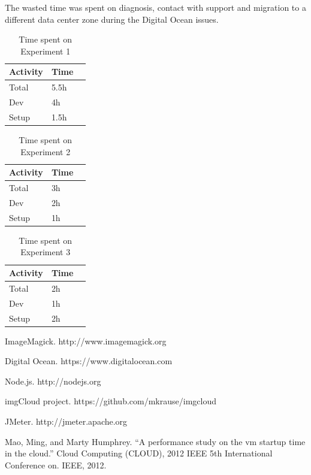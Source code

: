 \documentclass[conference]{IEEEtran}
\begin{document}
The wasted time was spent on diagnosis, contact with support and migration to a different data center zone during the Digital Ocean issues.

\begin{table}[H]
  \centering
  \begin{tabular}{| l | l | l |}
    \hline
    Activity & Time \\ \hline
    Total & 5.5h \\ \hline
    Dev & 4h \\ \hline
    Setup & 1.5h \\ \hline
  \end{tabular}
  \caption{Time spent on Experiment 1}
\end{table}

\begin{table}[H]
  \centering
  \begin{tabular}{| l | l | l |}
    \hline
    Activity & Time \\ \hline
    Total & 3h \\ \hline
    Dev & 2h \\ \hline
    Setup & 1h \\ \hline
  \end{tabular}
  \caption{Time spent on Experiment 2}
\end{table}

\begin{table}[H]
  \centering
  \begin{tabular}{| l | l | l |}
    \hline
    Activity & Time \\ \hline
    Total & 2h \\ \hline
    Dev & 1h \\ \hline
    Setup & 2h \\ \hline
  \end{tabular}
  \caption{Time spent on Experiment 3}
\end{table}

\begin{thebibliography}{6}

ImageMagick. http://www.imagemagick.org

Digital Ocean. https://www.digitalocean.com

Node.js. http://nodejs.org

imgCloud project. https://github.com/mkrause/imgcloud

JMeter. http://jmeter.apache.org

Mao, Ming, and Marty Humphrey. ``A performance study on the vm startup time in the cloud.'' Cloud Computing (CLOUD), 2012 IEEE 5th International Conference on. IEEE, 2012.

\end{thebibliography}
\end{document}

